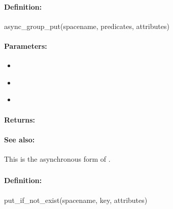 \paragraph{Definition:}
\begin{rubycode}
async_group_put(spacename, predicates, attributes)
\end{rubycode}

\paragraph{Parameters:}
\begin{itemize}[noitemsep]
\item {}\\

\item {}\\

\item {}\\

\end{itemize}

\paragraph{Returns:}


\paragraph{See also:}  This is the asynchronous form of .

\pagebreak
\subsubsection{}
\label{api:ruby:put_if_not_exist}


\paragraph{Definition:}
\begin{rubycode}
put_if_not_exist(spacename, key, attributes)
\end{rubycode}

